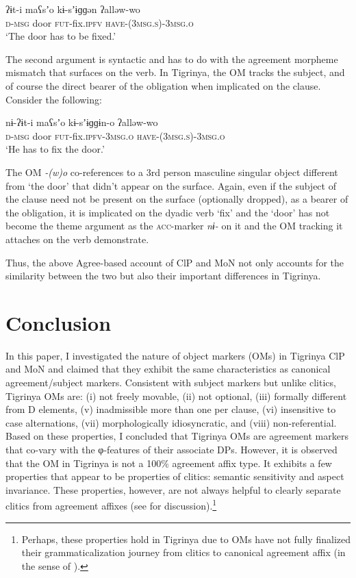 \documentclass[output=paper]{langscibook}
\begin{document}
\ea\label{ex:Gebregziabher:obliged} 
\gll ʔɨt-i maʕsʼo kɨ-sʼɨɡɡən  ʔalləw-wo\\
{\scshape d-msg} door {\scshape fut-}fix.{\scshape ipfv} {\scshape have-(3msg.s)-3msg.o}\\
\glt `The door has to be fixed.'  
\z 

The second argument is syntactic and has to do with the agreement morpheme mismatch that surfaces on the verb. In Tigrinya, the OM tracks the subject, and of course the direct bearer of the obligation when implicated on the clause. Consider the following:

\ea 
\gll nɨ-ʔɨt-i maʕsʼo kɨ-sʼɨɡɡɨn-o  ʔalləw-wo\\
{\scshape d-msg} door {\scshape fut-}fix.{\scshape ipfv-3msg.o} {\scshape have-(3msg.s)-3msg.o}\\
\glt `He has to fix the door.'  
\z

\noindent The OM \emph{-(w)o} co-references to a 3rd person masculine singular object different from `the door' that didn't appear on the surface. Again, even if the subject of the clause need not be present on the surface (optionally dropped), as a bearer of the obligation, it is implicated on the dyadic verb `fix' and the `door' has not become the theme argument as the {\scshape acc}-marker \emph{nɨ-} on it and the OM tracking it attaches on the verb demonstrate.

Thus, the above Agree-based account of ClP and MoN not only accounts for the similarity between the two but also their important differences in Tigrinya.

\section{Conclusion}\label{sec:gebregziabher:7}

In this paper, I investigated the nature of object markers (OMs) in Tigrinya ClP and MoN and claimed that they exhibit the same characteristics as canonical agreement/subject markers. Consistent with subject markers but unlike clitics, Tigrinya OMs are: (i) not freely movable, (ii) not optional, (iii) formally different from D elements, (v) inadmissible more than one per clause, (vi) insensitive to case alternations, (vii) morphologically idiosyncratic, and (viii) non-referential. Based on these properties, I concluded that Tigrinya OMs are agreement markers that co-vary with the φ-features of their associate DPs. However, it is observed that the OM in Tigrinya is not a 100\% agreement affix type. It exhibits a few properties that appear to be properties of clitics: semantic sensitivity and aspect invariance. These properties, however, are not always helpful to clearly separate clitics from agreement affixes (see \citealt{harizanov14} for discussion).\footnote{Perhaps, these properties hold in Tigrinya due to OMs have not fully finalized their grammaticalization journey from clitics to canonical agreement affix (in the sense of \citealt{fub05}).}
\end{document}
